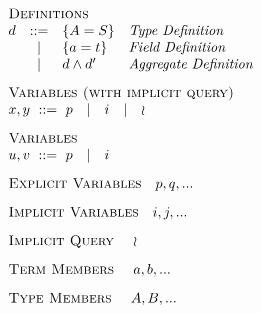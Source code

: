 \begin{minipage}[t]{.4\textwidth}\[\begin{array}{r c l l}
    \multicolumn{4}{l}{\textsc{Definitions}}                  \\
    d & ::= & \DEF{A}{S}      & \textit{Type Definition     } \\
      &  |  & \DEF{a}{t}      & \textit{Field Definition    } \\
      &  |  & \AGG{d}{d'}     & \textit{Aggregate Definition} \\[3mm]
    \multicolumn{4}{l}{\textsc{Variables (with implicit query)}} \\
    \multicolumn{4}{l}{x, y\ ::=\ p \quad | \quad i \quad | \quad \IMP} \\[3mm]
    \multicolumn{4}{l}{\textsc{Variables}} \\
    \multicolumn{4}{l}{u, v\ ::=\  p \quad | \quad i} \\[3mm]
    \multicolumn{4}{l}{\textsc{Explicit Variables} \quad p, q, ...} \\[3mm]
    \multicolumn{4}{l}{\textsc{Implicit Variables} \quad i, j, ...} \\[3mm]
    \multicolumn{4}{l}{\textsc{Implicit Query    } \quad \IMP     } \\[3mm]
    \multicolumn{4}{l}{\textsc{Term Members      } \quad a, b, ...} \\[3mm]
    \multicolumn{4}{l}{\textsc{Type Members      } \quad A, B, ...}
\end{array}\]\end{minipage}
